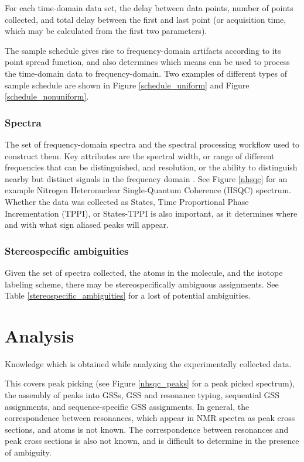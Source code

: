 For each time-domain data set, the delay between data points, number of 
points collected, and total delay between the first and last point (or 
acquisition time, which may be calculated from the first two parameters).

The sample schedule gives rise to frequency-domain artifacts according to 
its point spread function, and also determines which means can be used to
process the time-domain data to frequency-domain.  Two examples of different
types of sample schedule are shown in Figure \ref{schedule_uniform} and
Figure \ref{schedule_nonuniform}.

\subsubsection{Spectra}
The set of frequency-domain spectra and the spectral processing workflow
used to construct them.  Key attributes are the spectral width, or range of
different frequencies that can be distinguished, and resolution, or the
ability to distinguish nearby but distinct signals in the frequency domain
\cite{ernst2004}.  See Figure \ref{nhsqc} for an example Nitrogen 
Heteronuclear Single-Quantum Coherence (HSQC) spectrum.
Whether the data was collected as States, Time Proportional Phase Incrementation (TPPI), 
or States-TPPI is also important, as it determines where and with what sign 
aliased peaks will appear.

\subsubsection{Stereospecific ambiguities}
Given the set of spectra collected, the atoms in the molecule, and the isotope
labeling scheme, there may be stereospecifically ambiguous assignments.  See
Table \ref{stereospecific_ambiguities} for a lost of potential ambiguities.



\section{Analysis}
Knowledge which is obtained while analyzing the experimentally collected data.

This covers peak picking (see Figure \ref{nhsqc_peaks} for a peak picked spectrum), 
the assembly of peaks into GSSs, GSS and resonance typing, sequential
GSS assignments, and sequence-specific GSS assignments.
In general, the correspondence between resonances, which appear in NMR 
spectra as peak cross sections, and atoms is not known.  The correspondence 
between resonances and peak cross sections is also not known, and is difficult 
to determine in the presence of ambiguity.

